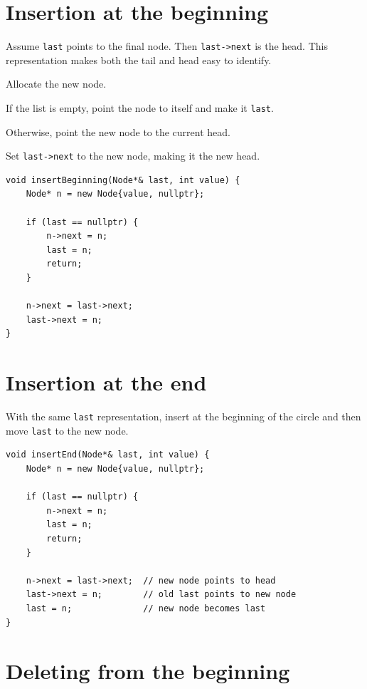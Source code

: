 \section{Insertion at the beginning}

Assume \texttt{last} points to the final node. Then \texttt{last->next} is the head. This representation makes both the tail and head easy to identify.

\begin{utpsteps}
  \item Allocate the new node.
  \item If the list is empty, point the node to itself and make it \texttt{last}.
  \item Otherwise, point the new node to the current head.
  \item Set \texttt{last->next} to the new node, making it the new head.
\end{utpsteps}

\begin{lstlisting}
void insertBeginning(Node*& last, int value) {
    Node* n = new Node{value, nullptr};

    if (last == nullptr) {
        n->next = n;
        last = n;
        return;
    }

    n->next = last->next;
    last->next = n;
}
\end{lstlisting}

\section{Insertion at the end}

With the same \texttt{last} representation, insert at the beginning of the circle and then move \texttt{last} to the new node.

\begin{lstlisting}
void insertEnd(Node*& last, int value) {
    Node* n = new Node{value, nullptr};

    if (last == nullptr) {
        n->next = n;
        last = n;
        return;
    }

    n->next = last->next;  // new node points to head
    last->next = n;        // old last points to new node
    last = n;              // new node becomes last
}
\end{lstlisting}

\section{Deleting from the beginning}

